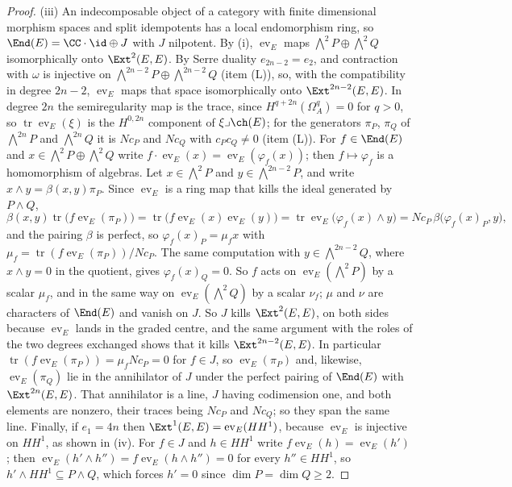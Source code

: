 \begin{proof}
(iii) An indecomposable object of a category with finite dimensional
morphism spaces and split idempotents has a local endomorphism ring, so
$\End(E)=\CC\cdot\id\oplus J$ with $J$ nilpotent. By
(i), $\operatorname{ev}_{E}$ maps
$\bigwedge^{2}P\oplus\bigwedge^{2}Q$ isomorphically onto $\Ext^{2}(E,E)$.
By Serre duality $e_{2n-2}=e_{2}$, and contraction with $\omega$ is injective
on $\bigwedge^{2n-2}P\oplus\bigwedge^{2n-2}Q$ (item (L)), so, with the
compatibility in degree $2n-2$, $\operatorname{ev}_{E}$ maps that space
isomorphically onto $\Ext^{2n-2}(E,E)$. In degree $2n$ the semiregularity map is the trace, since
$H^{q+2n}(\Omega^{q}_{A})=0$ for $q>0$, so
$\operatorname{tr}\operatorname{ev}_{E}(\xi)$ is the $H^{0,2n}$ component of
$\xi\lrcorner\ch(E)$; for the generators $\pi_{P}$, $\pi_{Q}$ of
$\bigwedge^{2n}P$ and $\bigwedge^{2n}Q$ it is $Nc_{P}$ and $Nc_{Q}$ with
$c_{P}c_{Q}\ne0$ (item (L)). For $f\in\End(E)$ and
$x\in\bigwedge^{2}P\oplus\bigwedge^{2}Q$ write
$f\cdot\operatorname{ev}_{E}(x)=\operatorname{ev}_{E}(\varphi_{f}(x))$; then
$f\mapsto\varphi_{f}$ is a homomorphism of algebras. Let $x\in\bigwedge^{2}P$
and $y\in\bigwedge^{2n-2}P$, and write $x\wedge y=\beta(x,y)\pi_{P}$. Since
$\operatorname{ev}_{E}$ is a ring map that kills the ideal generated by
$P\wedge Q$,
\[
  \beta(x,y)\operatorname{tr}\bigl(f\operatorname{ev}_{E}(\pi_{P})\bigr)
  =\operatorname{tr}\bigl(f\operatorname{ev}_{E}(x)\operatorname{ev}_{E}(y)\bigr)
  =\operatorname{tr}\operatorname{ev}_{E}\bigl(\varphi_{f}(x)\wedge y\bigr)
  =Nc_{P}\,\beta\bigl(\varphi_{f}(x)_{P},y\bigr),
\]
and the pairing $\beta$ is perfect, so $\varphi_{f}(x)_{P}=\mu_{f}x$ with
$\mu_{f}=\operatorname{tr}(f\operatorname{ev}_{E}(\pi_{P}))/Nc_{P}$. The same
computation with $y\in\bigwedge^{2n-2}Q$, where $x\wedge y=0$ in the quotient,
gives $\varphi_{f}(x)_{Q}=0$. So $f$ acts on
$\operatorname{ev}_{E}(\bigwedge^{2}P)$ by a scalar $\mu_{f}$, and in the same
way on $\operatorname{ev}_{E}(\bigwedge^{2}Q)$ by a scalar $\nu_{f}$; $\mu$ and
$\nu$ are characters of $\End(E)$ and vanish on $J$. So $J$ kills
$\Ext^{2}(E,E)$, on both sides because $\operatorname{ev}_{E}$ lands in the
graded centre, and the same argument with the roles of the two degrees
exchanged shows that it kills $\Ext^{2n-2}(E,E)$. In particular
$\operatorname{tr}(f\operatorname{ev}_{E}(\pi_{P}))=\mu_{f}Nc_{P}=0$ for
$f\in J$, so $\operatorname{ev}_{E}(\pi_{P})$ and, likewise,
$\operatorname{ev}_{E}(\pi_{Q})$ lie in the annihilator of $J$ under the
perfect pairing of $\End(E)$ with $\Ext^{2n}(E,E)$. That annihilator is a
line, $J$ having codimension one, and both elements are nonzero, their traces
being $Nc_{P}$ and $Nc_{Q}$; so they span the same line. Finally, if
$e_{1}=4n$ then $\Ext^{1}(E,E)=\operatorname{ev}_{E}(HH^{1})$, because
$\operatorname{ev}_{E}$ is injective on $HH^{1}$, as shown in (iv). For
$f\in J$ and $h\in HH^{1}$ write $f\operatorname{ev}_{E}(h)=
\operatorname{ev}_{E}(h')$; then
$\operatorname{ev}_{E}(h'\wedge h'')=f\operatorname{ev}_{E}(h\wedge h'')=0$ for
every $h''\in HH^{1}$, so $h'\wedge HH^{1}\subseteq P\wedge Q$, which forces
$h'=0$ since $\dim P=\dim Q\ge2$.


\end{proof}
